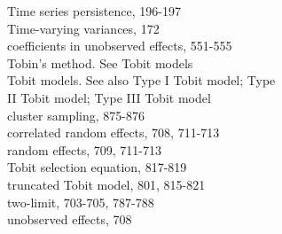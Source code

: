 \documentclass[10pt]{article}
\begin{document}
Time series persistence, 196-197\\
Time-varying variances, 172\\
coefficients in unobserved effects, 551-555\\
Tobin's method. See Tobit models\\
Tobit models. See also Type I Tobit model; Type\\
II Tobit model; Type III Tobit model\\
cluster sampling, 875-876\\
correlated random effects, 708, 711-713\\
random effects, 709, 711-713\\
Tobit selection equation, 817-819\\
truncated Tobit model, 801, 815-821\\
two-limit, 703-705, 787-788\\
unobserved effects, 708
\end{document}
